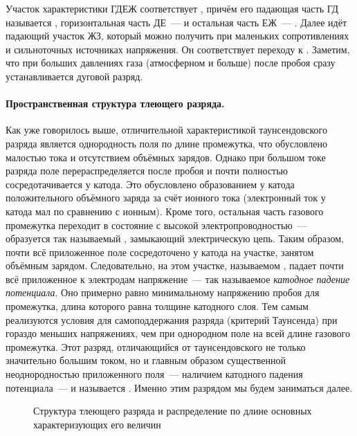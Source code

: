 Участок характеристики ГДЕЖ соответствует , причём
его падающая часть ГД называется
, горизонтальная часть ДЕ~---
 и остальная часть
ЕЖ~--- . Далее идёт падающий участок ЖЗ,
который можно получить при маленьких
сопротивлениях и сильноточных источниках напряжения. Он соответствует переходу к
. Заметим, что
при больших давлениях газа (атмосферном и больше) после пробоя сразу
устанавливается дуговой разряд.

\paragraph{Пространственная структура тлеющего разряда.}
Как уже говорилось выше, отличительной характеристикой таунсендовского разряда
является однородность поля по длине
промежутка, что обусловлено малостью тока и отсутствием объёмных зарядов. Однако
при большом токе разряда поле
перераспределяется после пробоя и почти полностью сосредотачивается у катода.
Это обусловлено образованием у катода
положительного объёмного заряда за счёт ионного тока (электронный ток у катода
мал по сравнению с ионным). Кроме того,
остальная часть газового промежутка переходит в состояние с высокой
электропроводностью~--- образуется так называемый
, замыкающий электрическую цепь. Таким образом, почти всё
приложенное поле сосредоточено у катода на
участке, занятом объёмным зарядом. Следовательно, на этом участке, называемом
, падает почти всё
приложенное к электродам напряжение~--- так называемое
\emph{катодное падение потенциала}. Оно примерно равно минимальному
напряжению пробоя для промежутка, длина которого равна толщине катодного слоя.
Тем самым реализуются условия для
самоподдержания разряда (критерий Таунсенда) при гораздо меньших напряжениях,
чем при однородном поле на всей длине
газового промежутка. Этот разряд, отличающийся от таунсендовского не только
значительно большим током, но и главным
образом существенной неоднородностью приложенного поля~--- наличием катодного
падения потенциала~--- и называется
. Именно этим разрядом мы будем заниматься далее.

\begin{figure}[h!]
	\centering
	\caption{Структура тлеющего разряда и распределение по длине основных
характеризующих его величин}
\end{figure}

